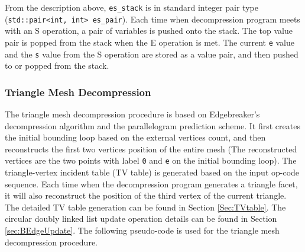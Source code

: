\documentclass[onecolumn, 12pt]{article}
\begin{document}
From the description above, \lstinline!es_stack! is in standard integer pair type (\lstinline!std::pair<int, int> es_pair!). Each time when decompression program meets with an S operation, a pair of variables is pushed onto the stack. The top value pair is popped from the stack when the E operation is met. The current \lstinline!e! value and the \lstinline!s! value from the S operation are stored as a value pair, and then pushed to or popped from the stack.


\subsubsection{Triangle Mesh Decompression}
The triangle mesh decompression procedure is based on Edgebreaker's decompression algorithm and the parallelogram prediction scheme. It first creates the initial bounding loop based on the external vertices count, and then reconstructs the first two vertices position of the entire mesh (The reconstructed vertices are the two points with label \lstinline!0! and \lstinline!e! on the initial bounding loop). The triangle-vertex incident table (TV table) is generated based on the input op-code sequence. Each time when the decompression program generates a triangle facet, it will also reconstruct the position of the third vertex of the current triangle. The detailed TV table generation can be found in Section \ref{Sec:TVtable}. The circular doubly linked list update operation details can be found in Section \ref{sec:BEdgeUpdate}. The following pseudo-code is used for the triangle mesh decompression procedure.
\end{document}
